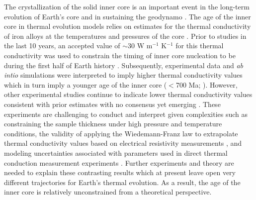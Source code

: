 \documentclass[9pt,twocolumn,twoside,lineno]{pnas-new}
\begin{document}
The crystallization of the solid inner core is an important event in the long-term evolution of Earth's core and in sustaining the geodynamo \cite{Buffett2000a}. The age of the inner core in thermal evolution models relies on estimates for the thermal conductivity of iron alloys at the temperatures and pressures of the core \cite{Ohta2021a}. Prior to studies in the last 10 years, an accepted value of $\sim$30 W m$^{-1}$ K$^{-1}$ for this thermal conductivity was used to constrain the timing of inner core nucleation to be during the first half of Earth history \cite{Stacey2007a, Konopkova2016a}. Subsequently, experimental data and \textit{ab intio} simulations were interpreted to imply higher thermal conductivity values \cite{Pozzo2012a, Ohta2016a} which in turn imply a younger age of the inner core ($<$700 Ma; \citealp{Labrosse2015a}). However, other experimental studies continue to indicate lower thermal conductivity values consistent with prior estimates \cite{Konopkova2016a, Hsieh2020a} with no consensus yet emerging \cite{Williams2018a, Ohta2021a}. These experiments are challenging to conduct and interpret given complexities such as constraining the sample thickness under high pressure and temperature conditions, the validity of applying the Wiedemann-Franz law to extrapolate thermal conductivity values based on electrical resistivity measurements \cite{Ohta2016a}, and modeling uncertainties associated with parameters used in direct thermal conduction measurement experiments \cite{Konopkova2016a}. Further experiments and theory are needed to explain these contrasting results which at present leave open very different trajectories for Earth's thermal evolution. As a result, the age of the inner core is relatively unconstrained from a theoretical perspective. 
\end{document}
